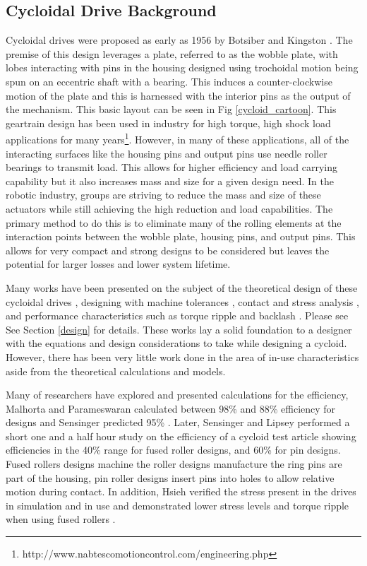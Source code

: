 \documentclass[letterpaper, 10 pt, conference]{ieeeconf}  %
\begin{document}
\subsection{Cycloidal Drive Background}
Cycloidal drives were proposed as early as 1956 by Botsiber and Kingston \cite{1956}. The premise of this design leverages a plate, referred to as the wobble plate, with lobes interacting with pins in the housing designed using trochoidal motion being spun on an eccentric shaft with a bearing. This induces a counter-clockwise motion of the plate and this is harnessed with the interior pins as the output of the mechanism. This basic layout can be seen in Fig \ref{cycloid_cartoon}. This geartrain design has been used in industry for high torque, high shock load applications for many years\footnote{http://www.nabtescomotioncontrol.com/engineering.php}. However, in many of these applications, all of the interacting surfaces like the housing pins and output pins use needle roller bearings to transmit load. This allows for higher efficiency and load carrying capability but it also increases mass and size for a given design need. In the robotic industry, groups are striving to reduce the mass and size of these actuators while still achieving the high reduction and load capabilities. The primary method to do this is to eliminate many of the rolling elements at the interaction points between the wobble plate, housing pins, and output pins. This allows for very compact and strong designs to be considered but leaves the potential for larger losses and lower system lifetime. 

Many works have been presented on the subject of the theoretical design of these cycloidal drives \cite{on_the_lobe} \cite{hwang_hsieh}, designing with machine tolerances \cite{design_and_application}, contact and stress analysis \cite{li}, and performance characteristics such as torque ripple and backlash \cite{hsieh_traditional} \cite{hsieh_dynamics}. Please see See Section \ref{design} for details. These works lay a solid foundation to a designer with the equations and design considerations to take while designing a cycloid. However, there has been very little work done in the area of in-use characteristics aside from the theoretical calculations and models. 

Many of researchers have explored and presented calculations for the efficiency, Malhorta and Parameswaran calculated between 98\% and 88\% efficiency for designs \cite{Malhorta} and Sensinger predicted 95\% \cite{unified_approach}. Later, Sensinger and Lipsey performed a short one and a half hour study on the efficiency of a cycloid test article \cite{cycloid_vs_harmonic} showing efficiencies in the 40\% range for fused roller designs, and 60\% for pin designs. Fused rollers designs machine the roller designs manufacture the ring pins are part of the housing, pin roller designs insert pins into holes to allow relative motion during contact. In addition, Hsieh verified the stress present in the drives in simulation and in use and demonstrated lower stress levels and torque ripple when using fused rollers \cite{hsieh_dynamics}. 
\end{document}
